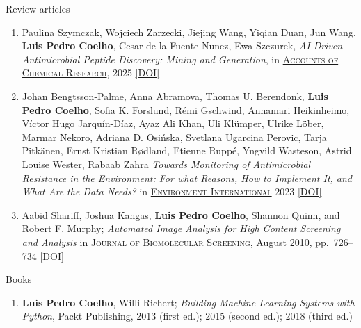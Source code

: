 \documentclass{article}
\renewcommand\subsection[1]{%
    \par\vspace{.1em}%
    {\hspace{0em}\subsubhead #1}%
    \par\vspace{.4em}%
}
\renewcommand\subsubsection[1]{%
    \par\vspace{.1em}%
    {\hspace{1em}\subsubsubhead #1}%
    \par\vspace{.2em}%
}
\newcommand\showdoi[1]{%
    \href{http://dx.doi.org/#1}{[DOI]}%
}
\newcommand\pubname[1]{\textsc{\uline{#1}}}
\begin{document}
\subsubsection{Review articles}
\begin{enumerate}[resume]

\item Paulina Szymczak, Wojciech Zarzecki, Jiejing Wang, Yiqian Duan, Jun Wang, \textbf{Luis Pedro Coelho}, Cesar de la Fuente-Nunez, Ewa Szczurek, \emph{AI-Driven Antimicrobial Peptide Discovery: Mining and Generation}, in \pubname{Accounts of Chemical Research}, 2025 \showdoi{10.1021/acs.accounts.0c00594}

\item Johan Bengtsson-Palme, Anna Abramova, Thomas U. Berendonk, \textbf{Luis Pedro Coelho}, Sofia K. Forslund, Rémi Gschwind, Annamari Heikinheimo, Víctor Hugo Jarquín-Díaz, Ayaz Ali Khan, Uli Klümper, Ulrike Löber, Marmar Nekoro, Adriana D. Osińska, Svetlana Ugarcina Perovic, Tarja Pitkänen, Ernst Kristian Rødland, Etienne Ruppé, Yngvild Wasteson, Astrid Louise Wester, Rabaab Zahra \emph{Towards Monitoring of Antimicrobial Resistance in the Environment: For what Reasons, How to Implement It, and What Are the Data Needs?} in \pubname{Environment International} 2023 \showdoi{10.1016/j.envint.2023.108089}

\item Aabid Shariff, Joshua Kangas, \textbf{Luis Pedro Coelho}, Shannon Quinn,
and Robert F. Murphy; \emph{Automated Image Analysis for High Content Screening
and Analysis} in \pubname{Journal of Biomolecular Screening}, August 2010, pp.\
726--734 \showdoi{10.1177/1087057110370894}
\end{enumerate}

\subsection{Books}
\begin{enumerate}
\item \textbf{Luis Pedro Coelho}, Willi Richert; \emph{Building Machine
Learning Systems with Python}, Packt Publishing, 2013 (first ed.); 2015
(second ed.); 2018 (third ed.)
\end{enumerate}

\break
\end{document}
